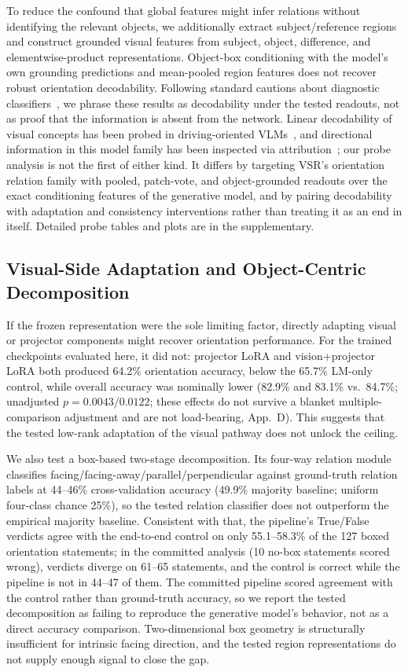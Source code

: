 To reduce the confound that global features might infer relations without identifying the relevant objects, we additionally extract subject/reference regions and construct grounded visual features from subject, object, difference, and elementwise-product representations. Object-box conditioning with the model's own grounding predictions and mean-pooled region features does not recover robust orientation decodability. Following standard cautions about diagnostic classifiers~\cite{hewitt2019probes}, we phrase these results as decodability under the tested readouts, not as proof that the information is absent from the network. Linear decodability of visual concepts has been probed in driving-oriented VLMs~\cite{theodoridis2026probing}, and directional information in this model family has been inspected via attribution~\cite{tan2026creg}; our probe analysis is not the first of either kind. It differs by targeting VSR's orientation relation family with pooled, patch-vote, and object-grounded readouts over the exact conditioning features of the generative model, and by pairing decodability with adaptation and consistency interventions rather than treating it as an end in itself. Detailed probe tables and plots are in the supplementary.

\subsection{Visual-Side Adaptation and Object-Centric Decomposition}
If the frozen representation were the sole limiting factor, directly adapting visual or projector components might recover orientation performance. For the trained checkpoints evaluated here, it did not: projector LoRA and vision+projector LoRA both produced 64.2\% orientation accuracy, below the 65.7\% LM-only control, while overall accuracy was nominally lower (82.9\% and 83.1\% vs.\ 84.7\%; unadjusted $p{=}0.0043$/$0.0122$; these effects do not survive a blanket multiple-comparison adjustment and are not load-bearing, App.~D). This suggests that the tested low-rank adaptation of the visual pathway does not unlock the ceiling.

We also test a box-based two-stage decomposition. Its four-way relation module classifies facing/facing-away/parallel/perpendicular against ground-truth relation labels at 44--46\% cross-validation accuracy (49.9\% majority baseline; uniform four-class chance 25\%), so the tested relation classifier does not outperform the empirical majority baseline. Consistent with that, the pipeline's True/False verdicts agree with the end-to-end control on only 55.1--58.3\% of the 127 boxed orientation statements; in the committed analysis (10 no-box statements scored wrong), verdicts diverge on 61--65 statements, and the control is correct while the pipeline is not in 44--47 of them. The committed pipeline scored agreement with the control rather than ground-truth accuracy, so we report the tested decomposition as failing to reproduce the generative model's behavior, not as a direct accuracy comparison. Two-dimensional box geometry is structurally insufficient for intrinsic facing direction, and the tested region representations do not supply enough signal to close the gap.

